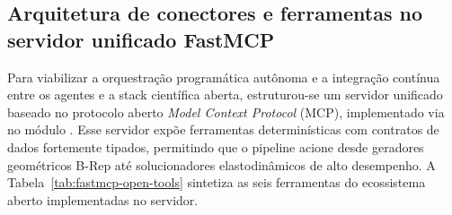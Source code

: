 \subsection{Arquitetura de conectores e ferramentas no servidor unificado FastMCP}
\label{subsec:fastmcp-tools}

Para viabilizar a orquestração programática autônoma e a integração contínua entre os agentes e a stack científica aberta, estruturou-se um servidor unificado baseado no protocolo aberto \textit{Model Context Protocol} (MCP), implementado via  no módulo . Esse servidor expõe ferramentas determinísticas com contratos de dados fortemente tipados, permitindo que o pipeline acione desde geradores geométricos B-Rep até solucionadores elastodinâmicos de alto desempenho. A Tabela~\ref{tab:fastmcp-open-tools} sintetiza as seis ferramentas do ecossistema aberto implementadas no servidor.

